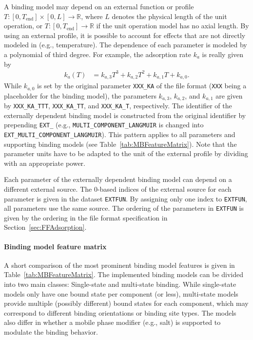 A binding model may depend on an external function or profile $T\colon \left[ 0, T_{\text{end}}\right] \times [0, L] \to \mathds{R}$, where $L$ denotes the physical length of the unit operation, or $T\colon \left[0, T_{\text{end}}\right] \to \mathds{R}$ if the unit operation model has no axial length. 
By using an external profile, it is possible to account for effects that are not directly modeled in \CADET{} (e.g., temperature).
The dependence of each parameter is modeled by a polynomial of third degree.
For example, the adsorption rate $k_a$ is really given by
\begin{align*}
  k_a(T) &= k_{a,3} T^3 + k_{a,2} T^2 + k_{a,1} T + k_{a,0}.
\end{align*}
While $k_{a,0}$ is set by the original parameter \texttt{XXX\_KA} of the file format (\texttt{XXX} being a placeholder for the binding model), the parameters $k_{a,3}$, $k_{a,2}$, and $k_{a,1}$ are given by \texttt{XXX\_KA\_TTT}, \texttt{XXX\_KA\_TT}, and \texttt{XXX\_KA\_T}, respectively.
The identifier of the externally dependent binding model is constructed from the original identifier by prepending \texttt{EXT\_} (e.g., \texttt{MULTI\_COMPONENT\_LANGMUIR} is changed into \texttt{EXT\_MULTI\_COMPONENT\_LANGMUIR}).
This pattern applies to all parameters and supporting binding models (see Table~\ref{tab:MBFeatureMatrix}).
Note that the parameter units have to be adapted to the unit of the external profile by dividing with an appropriate power.

Each parameter of the externally dependent binding model can depend on a different external source.
The 0-based indices of the external source for each parameter is given in the dataset \texttt{EXTFUN}.
By assigning only one index to \texttt{EXTFUN}, all parameters use the same source.
The ordering of the parameters in \texttt{EXTFUN} is given by the ordering in the file format specification in Section~\ref{sec:FFAdsorption}.

\paragraph{Binding model feature matrix}
\label{par:MBFeatureMatrix}

A short comparison of the most prominent binding model features is given in Table~\ref{tab:MBFeatureMatrix}.
The implemented binding models can be divided into two main classes: Single-state and multi-state binding.
While single-state models only have one bound state per component (or less), multi-state models provide multiple (possibly different) bound states for each component, which may correspond to different binding orientations or binding site types.
The models also differ in whether a mobile phase modifier (e.g., salt) is supported to modulate the binding behavior.

